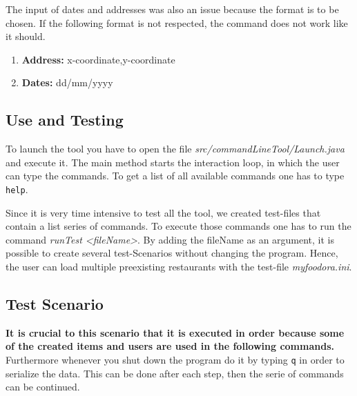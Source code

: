 The input of dates and addresses was also an issue because the format is to be chosen. If the 
following format is not respected, the command does not work like it should.
\begin{enumerate}
	\item \textbf{Address: } x-coordinate,y-coordinate
	\item \textbf{Dates: } dd/mm/yyyy
\end{enumerate}

\subsection{Use and Testing}
\label{sub:use_and_testing}

To launch the tool you have to open the file \textit{src/commandLineTool/Launch.java} and execute
it. The main method starts the interaction loop, in which the user can type the commands. To get
a list of all available commands one has to type \lstinline|help|. 

Since it is very time intensive to test all the tool, we created test-files that
contain a list series of commands. To execute those commands one has to run the command 
\textit{runTest <fileName>}. By adding the fileName as an argument, it is possible to create 
several test-Scenarios without changing the program. Hence, the user can load multiple 
preexisting restaurants with the test-file \textit{my\textunderscore foodora.ini}.

\subsection{Test Scenario}
\label{sub:test_scenario}

\textbf{It is crucial to this scenario that it is executed in order because some of the created items and 
users are used in the following commands.} Furthermore whenever you shut down the program do it by
typing \lstinline|q| in order to serialize the data. This can be done after each step, then the 
serie of commands can be continued.


